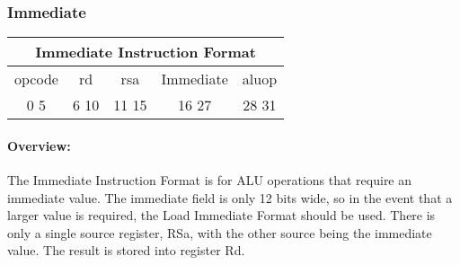 \documentclass[letterpaper, 11pt]{article}
\begin{document}
\newpage
\subsubsection{Immediate}

\begin{center}
		\begin{tabular}{|c|c|c|c|c|}
			\multicolumn{5}{c}{Immediate Instruction Format}\\ \hline
			\hspace{2pt} opcode \hspace{2pt} & \hspace{5pt} rd \hspace{5pt} &  \hspace{4pt} rsa \hspace{4pt} & \hspace{10pt}Immediate  \hspace{10pt} & \hspace{3pt} aluop \hspace{3pt}   \\	\hline
			0 \hfill 5&6 \hfill 10&11 \hfill 15& 16 \hfill 27&28 \hfill 31\\ \hline
		
	\end{tabular}
\end{center}
\paragraph{Overview:}The Immediate Instruction Format is for ALU operations that require an immediate value. The immediate field
is only 12 bits wide, so in the event that a larger value is required, the Load Immediate Format should be used. There is only a single
source register, RSa, with the other source being the immediate value. The result is stored into register Rd.
\end{document}
